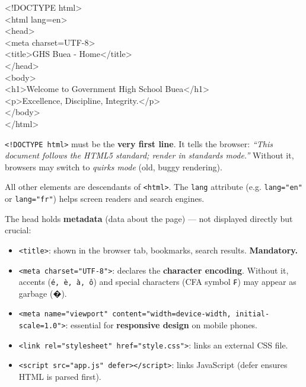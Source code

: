 \documentclass[11pt]{article}
\begin{document}
\begin{exemplebox}
\begin{flushleft}\ttfamily\small
\textless{}!DOCTYPE html\textgreater{}\\
\textless{}html lang=\textquotedbl{}en\textquotedbl{}\textgreater{}\\
\textless{}head\textgreater{}\\
\quad \textless{}meta charset=\textquotedbl{}UTF-8\textquotedbl{}\textgreater{}\\
\quad \textless{}title\textgreater{}GHS Buea - Home\textless{}/title\textgreater{}\\
\textless{}/head\textgreater{}\\
\textless{}body\textgreater{}\\
\quad \textless{}h1\textgreater{}Welcome to Government High School Buea\textless{}/h1\textgreater{}\\
\quad \textless{}p\textgreater{}Excellence, Discipline, Integrity.\textless{}/p\textgreater{}\\
\textless{}/body\textgreater{}\\
\textless{}/html\textgreater{}
\end{flushleft}
\end{exemplebox}

\begin{definition}
\texttt{<!DOCTYPE html>} must be the \textbf{very first line}. It tells the browser: \emph{``This document follows the HTML5 standard; render in standards mode.''} Without it, browsers may switch to \emph{quirks mode} (old, buggy rendering).
\end{definition}

\begin{definition}
All other elements are descendants of \texttt{<html>}. The \texttt{lang} attribute (e.g. \texttt{lang="en"} or \texttt{lang="fr"}) helps screen readers and search engines.
\end{definition}

\begin{definition}
The head holds \textbf{metadata} (data about the page) --- not displayed directly but crucial:
\begin{itemize}
\item \texttt{<title>}: shown in the browser tab, bookmarks, search results. \textbf{Mandatory.}
\item \texttt{<meta charset="UTF-8">}: declares the \textbf{character encoding}. Without it, accents (\texttt{é, è, à, ô}) and special characters (CFA symbol \texttt{₣}) may appear as garbage (�).
\item \texttt{<meta name="viewport" content="width=device-width, initial-scale=1.0">}: essential for \textbf{responsive design} on mobile phones.
\item \texttt{<link rel="stylesheet" href="style.css">}: links an external CSS file.
\item \texttt{<script src="app.js" defer></script>}: links JavaScript (defer ensures HTML is parsed first).
\end{itemize}
\end{definition}
\end{document}
